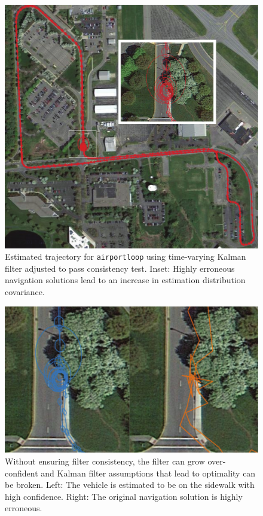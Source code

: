 \begin{figure}[!bthp]
\includegraphics[width=\columnwidth]{airportloop_map}
\caption{Estimated trajectory for \texttt{airportloop} using time-varying Kalman filter adjusted to pass consistency test.  Inset: Highly erroneous navigation solutions lead to an increase in estimation distribution covariance.}
\label{fig:airportloop_map}
\end{figure} 

\begin{figure}
\includegraphics[width=\columnwidth]{airportloop_map_bad}
\caption{Without ensuring filter consistency, the filter can grow over-confident and Kalman filter assumptions that lead to optimality can be broken.  Left: The vehicle is estimated to be on the sidewalk with high confidence.  Right: The original navigation solution is highly erroneous.}
\label{fig:airportloop_map_bad}
\end{figure}

